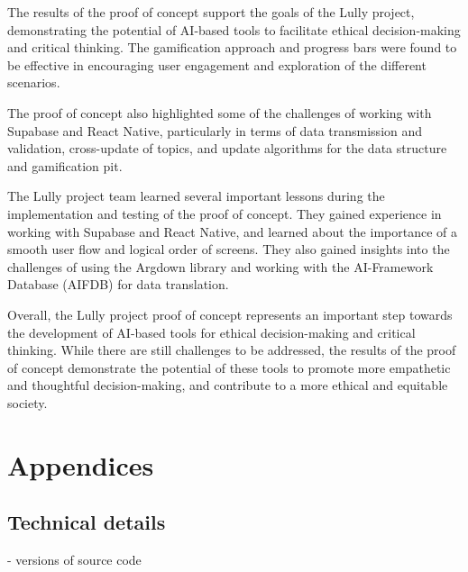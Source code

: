 \documentclass{article}
\begin{document}
The results of the proof of concept support the goals of the Lully project, demonstrating the potential of AI-based tools to facilitate ethical decision-making and critical thinking. The gamification approach and progress bars were found to be effective in encouraging user engagement and exploration of the different scenarios.

The proof of concept also highlighted some of the challenges of working with Supabase and React Native, particularly in terms of data transmission and validation, cross-update of topics, and update algorithms for the data structure and gamification pit.

The Lully project team learned several important lessons during the implementation and testing of the proof of concept. They gained experience in working with Supabase and React Native, and learned about the importance of a smooth user flow and logical order of screens. They also gained insights into the challenges of using the Argdown library and working with the AI-Framework Database (AIFDB) for data translation.

Overall, the Lully project proof of concept represents an important step towards the development of AI-based tools for ethical decision-making and critical thinking. While there are still challenges to be addressed, the results of the proof of concept demonstrate the potential of these tools to promote more empathetic and thoughtful decision-making, and contribute to a more ethical and equitable society.

\blindtext
\newpage

\section{Appendices}
\subsection{Technical details}
- versions of source code
\newpage

\newpage
\printbibliography
\end{document}
